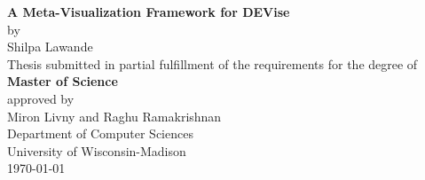 \documentclass[10pt]{article}
\begin{document}
\thispagestyle{empty}
\begin{center}
\vspace{2in}
{\Huge \bf A Meta-Visualization Framework for DEVise }\\
\vspace{0.75in}
by \\
{\Large Shilpa Lawande}\\
\vspace{1in}
Thesis submitted in partial fulfillment of the requirements for the degree of\\
{\large \bf Master of Science} \\
approved by \\
{\Large Miron Livny} and {\Large Raghu Ramakrishnan} \\
\vspace{2in}
{\large Department of Computer Sciences} \\
{\large University of Wisconsin-Madison}\\
\today
\end{center}

\pagebreak
% 







%

%
\end{document}

